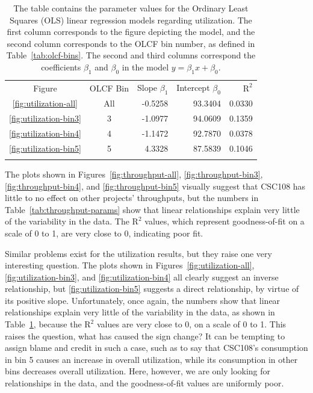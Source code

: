 \begin{table}
\caption{The table contains the parameter values for the Ordinary Least Squares
(OLS) linear regression models regarding utilization. The first column
corresponds to the figure depicting the model, and the second column
corresponds to the OLCF bin number, as defined in Table~\ref{tab:olcf-bins}.
The second and third columns correspond the coefficients $\beta_1$ and
$\beta_0$ in the model $y = \beta_{1}x + \beta_0$.}
\label{tab:utilization-params}       %
\begin{tabular}{ccrrr}
\hline\noalign{\smallskip}
Figure  & OLCF Bin & Slope $\beta_1$  & Intercept $\beta_0$  &  $\text{R}^2$ \\
\noalign{\smallskip}\hline\noalign{\smallskip}
\ref{fig:utilization-all}    &   All &  -0.5258 &   93.3404     &   0.0330  \\
\ref{fig:utilization-bin3}   &   3   &  -1.0977 &   94.0609     &   0.1359  \\
\ref{fig:utilization-bin4}   &   4   &  -1.1472 &   92.7870     &   0.0378  \\
\ref{fig:utilization-bin5}   &   5   &   4.3328 &   87.5839     &   0.1046  \\
\noalign{\smallskip}\hline
\end{tabular}
\end{table}

The plots shown in Figures~\ref{fig:throughput-all}, \ref{fig:throughput-bin3},
\ref{fig:throughput-bin4}, and \ref{fig:throughput-bin5} visually suggest that
CSC108 has little to no effect on other projects' throughputs, but the numbers
in Table~\ref{tab:throughput-params} show that linear relationships explain
very little of the variability in the data. The $\text{R}^2$ values, which
represent goodness-of-fit on a scale of 0 to 1, are very close to 0, indicating
poor fit.

Similar problems exist for the utilization results, but they raise one very
interesting question. The plots shown in Figures~\ref{fig:utilization-all},
\ref{fig:utilization-bin3}, and \ref{fig:utilization-bin4} all clearly suggest
an inverse relationship, but \ref{fig:utilization-bin5} suggests a direct
relationship, by virtue of its positive slope. Unfortunately, once again, the
numbers show that linear relationships explain very little of the variability
in the data, as shown in Table~\ref{tab:utilization-params}, because the
$\text{R}^2$ values are very close to 0, on a scale of 0 to 1. This raises the
question, what has caused the sign change? It can be tempting to assign blame
and credit in such a case, such as to say that CSC108's consumption in bin 5
causes an increase in overall utilization, while its consumption in other bins
decreases overall utilization. Here, however, we are only looking for
relationships in the data, and the goodness-of-fit values are uniformly poor. 


